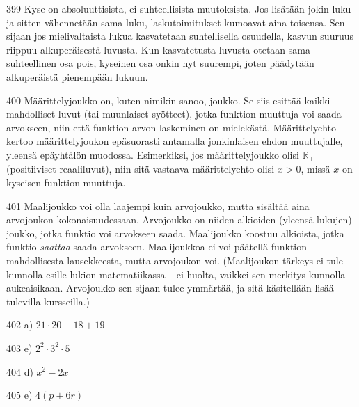 \begin{Vastaus}{399}
	Kyse on absoluuttisista, ei suhteellisista muutoksista. Jos lisätään jokin luku ja sitten vähennetään sama luku, laskutoimitukset kumoavat aina toisensa. Sen sijaan jos mielivaltaista lukua kasvatetaan suhtellisella osuudella, kasvun suuruus riippuu alkuperäisestä luvusta. Kun kasvatetusta luvusta otetaan sama suhteellinen osa pois, kyseinen osa onkin nyt suurempi, joten päädytään alkuperäistä pienempään lukuun.
	
\end{Vastaus}
\begin{Vastaus}{400}
Määrittelyjoukko on, kuten nimikin sanoo, joukko. Se siis esittää kaikki mahdolliset luvut (tai muunlaiset syötteet), jotka funktion muuttuja voi saada arvokseen, niin että funktion arvon laskeminen on mielekästä. Määrittelyehto kertoo määrittelyjoukon epäsuorasti antamalla jonkinlaisen ehdon muuttujalle, yleensä epäyhtälön muodossa. Esimerkiksi, jos määrittelyjoukko olisi $\mathbb{R}_+$ (positiiviset reaaliluvut), niin sitä vastaava määrittelyehto olisi $x>0$, missä $x$ on kyseisen funktion muuttuja.
\end{Vastaus}
\begin{Vastaus}{401}
Maalijoukko voi olla laajempi kuin arvojoukko, mutta sisältää aina arvojoukon kokonaisuudessaan. Arvojoukko on niiden alkioiden (yleensä lukujen) joukko, jotka funktio voi arvokseen saada. Maalijoukko koostuu alkioista, jotka funktio \textit{saattaa} saada arvokseen. Maalijoukkoa ei voi päätellä funktion mahdollisesta lausekkeesta, mutta arvojoukon voi. (Maalijoukon tärkeys ei tule kunnolla esille lukion matematiikassa -- ei huolta, vaikkei sen merkitys kunnolla aukeaisikaan. Arvojoukko sen sijaan tulee ymmärtää, ja sitä käsitellään lisää tulevilla kursseilla.)
	
\end{Vastaus}
\begin{Vastaus}{402}
	 a) $21\cdot 20-18+19$
	
\end{Vastaus}
\begin{Vastaus}{403}
	 e) $2^2\cdot3^2\cdot5$
	
\end{Vastaus}
\begin{Vastaus}{404}
	d) $x^2-2x$
    
\end{Vastaus}
\begin{Vastaus}{405}
	e) $4(p+6r)$
    
\end{Vastaus}
